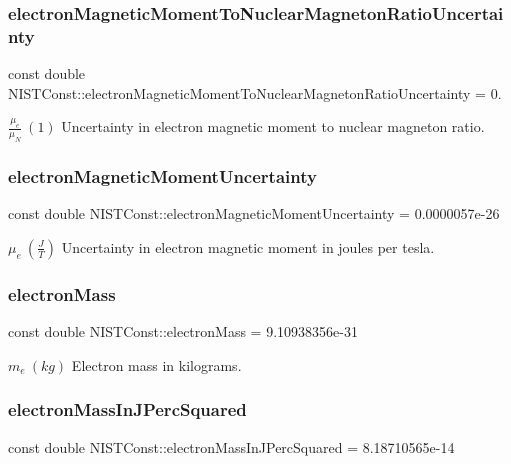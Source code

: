 \subsubsection{\texorpdfstring{electron\+Magnetic\+Moment\+To\+Nuclear\+Magneton\+Ratio\+Uncertainty}{electronMagneticMomentToNuclearMagnetonRatioUncertainty}}
{\footnotesize\ttfamily const double N\+I\+S\+T\+Const\+::electron\+Magnetic\+Moment\+To\+Nuclear\+Magneton\+Ratio\+Uncertainty = 0.}

$\frac{\mu_e}{\mu_N} \ (1)$ Uncertainty in electron magnetic moment to nuclear magneton ratio. \mbox{\label{group___electron_ga0708e99452bf307ef0514f373323f12d}} 
\subsubsection{\texorpdfstring{electron\+Magnetic\+Moment\+Uncertainty}{electronMagneticMomentUncertainty}}
{\footnotesize\ttfamily const double N\+I\+S\+T\+Const\+::electron\+Magnetic\+Moment\+Uncertainty = 0.\+0000057e-\/26}

$\mu_e \ (\frac{J}{T})$ Uncertainty in electron magnetic moment in joules per tesla. \mbox{\label{group___electron_ga2c9773ce81cfbe85e9042adccd788589}} 
\subsubsection{\texorpdfstring{electron\+Mass}{electronMass}}
{\footnotesize\ttfamily const double N\+I\+S\+T\+Const\+::electron\+Mass = 9.\+10938356e-\/31}

$m_e \ (kg)$ Electron mass in kilograms. \mbox{\label{group___electron_gad128828903af19e91fdc1a95ef9cbb24}} 
\subsubsection{\texorpdfstring{electron\+Mass\+In\+J\+Perc\+Squared}{electronMassInJPercSquared}}
{\footnotesize\ttfamily const double N\+I\+S\+T\+Const\+::electron\+Mass\+In\+J\+Perc\+Squared = 8.\+18710565e-\/14}

